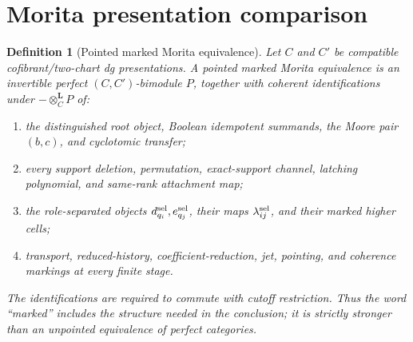 \documentclass[11pt]{article}
\newtheorem{definition}[theorem]{Definition}
\theoremstyle{remark}
\begin{document}
\section{Morita presentation comparison}
\label{sec:morita-invariance}

\begin{definition}[Pointed marked Morita equivalence]
\label{P2M-def:pointed-marked-morita-equivalence}
Let \(C\) and \(C'\) be compatible cofibrant/two-chart dg presentations.  A
\emph{pointed marked Morita equivalence} is an invertible perfect
\((C,C')\)-bimodule \(P\), together with coherent identifications under
\(-\otimes_C^{\mathbf L}P\) of:
\begin{enumerate}[label=\textup{(\roman*)}]
\item the distinguished root object, Boolean idempotent summands, the Moore
      pair \((b,c)\), and cyclotomic transfer;
\item every support deletion, permutation, exact-support channel, latching
      polynomial, and same-rank attachment map;
\item the role-separated objects \(d_{q_i}^{\rm sel},e_{q_j}^{\rm sel}\),
      their maps \(\lambda_{ij}^{\rm sel}\), and their marked higher cells;
\item transport, reduced-history, coefficient-reduction, jet, pointing, and
      coherence markings at every finite stage.
\end{enumerate}
The identifications are required to commute with cutoff restriction.  Thus the
word ``marked'' includes the structure needed in the conclusion; it is
strictly stronger than an unpointed equivalence of perfect categories.
\end{definition}
\end{document}
